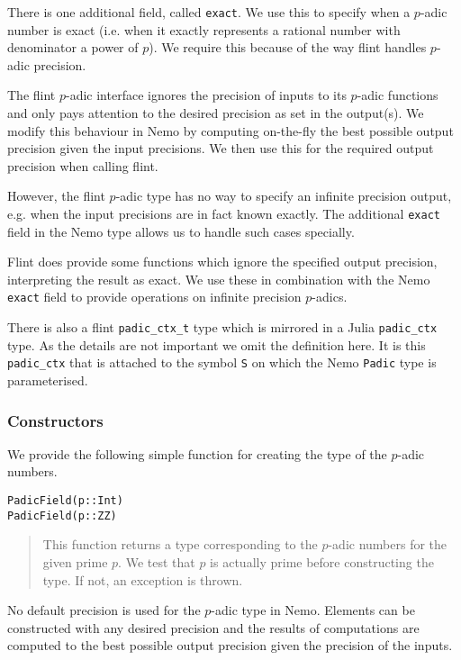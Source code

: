 \documentclass[a4paper,10pt]{article}
\newcommand{\code}{\lstinline}
\newcommand{\desc}[1]{\vspace{-3mm}\begin{quote}#1\end{quote}}
\begin{document}
{{There is one additional field, called \code{exact}. We use this to specify
when a $p$-adic number is exact (i.e. when it exactly represents a rational
number with denominator a power of $p$). We require this because of the way
flint handles $p$-adic precision.

The flint $p$-adic interface ignores the precision of inputs to its $p$-adic
functions and only pays attention to the desired precision as set in the
output(s). We modify this behaviour in Nemo by computing on-the-fly the best
possible output precision given the input precisions. We then use this for the
required output precision when calling flint.

However, the flint $p$-adic type has no way to specify an infinite precision
output, e.g. when the input precisions are in fact known exactly. The
additional \code{exact} field in the Nemo type allows us to handle such cases
specially.

Flint does provide some functions which ignore the specified output precision,
interpreting the result as exact. We use these in combination with the Nemo
\code{exact} field to provide operations on infinite precision $p$-adics.

There is also a flint \code{padic_ctx_t} type which is mirrored in a Julia
\code{padic_ctx} type. As the details are not important we omit the definition
here. It is this \code{padic_ctx} that is attached to the symbol \code{S} on
which the Nemo \code{Padic} type is parameterised.

\subsubsection{Constructors}

We provide the following simple function for creating the type of the $p$-adic
numbers.

\begin{lstlisting}
PadicField(p::Int)
PadicField(p::ZZ)
\end{lstlisting}

\desc{This function returns a type corresponding to the $p$-adic numbers for
the given prime $p$. We test that $p$ is actually prime before constructing
the type. If not, an exception is thrown.}

No default precision is used for the $p$-adic type in Nemo. Elements can be
constructed with any desired precision and the results of computations are
computed to the best possible output precision given the precision of the
inputs. 

}}
\end{document}
